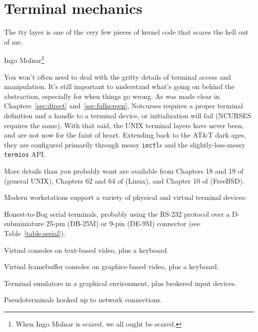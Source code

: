\section{Terminal mechanics}
\label{section:tty}
\epigraph{The tty layer is one of the very few pieces of kernel code that scares the hell out of me.}{Ingo Molnar\footnote{When Ingo Molnar is scared, we all ought be scared.}\cite{molnarhell}}
You won't often need to deal with the gritty details of terminal access and
manipulation. It's still important to understand what's going on behind the
abstraction, especially for when things go wrong. As was made clear in
Chapters~\ref{sec:direct} and~\ref{sec:fullscreen}, Notcurses requires a
proper terminal definition and a handle to a terminal device, or initialization
will fail (NCURSES requires the same). With that said, the UNIX terminal layers
have never been, and are not now for the faint of heart. Extending back to the
AT\&T dark ages, they are configured primarily through messy \texttt{ioctl}s
and the slightly-less-messy \texttt{termios} API.

More details than you probably want are available from Chapters 18 and 19 of \cite{apiue}
(general UNIX), Chapters 62 and 64 of \cite{linuxprogramming} (Linux), and Chapter
10 of \cite{freebsddesign} (FreeBSD).

Modern workstations support a variety of physical and virtual terminal devices:
\begin{denseitemize}
\item{Honest-to-Bog serial terminals, probably using the RS-232\cite{rs232}
      protocol over a D-subminiature 25-pin (DB-25M) or 9-pin (DE-9M)
      connector (see Table~\ref{table:serial}).}
\item{Virtual consoles on text-based video, plus a keyboard.}
\item{Virtual framebuffer consoles on graphics-based video, plus a keyboard.} 
\item{Terminal emulators in a graphical environment, plus brokered input devices.}
\item{Pseudoterminals hooked up to network connections.}
\end{denseitemize}

